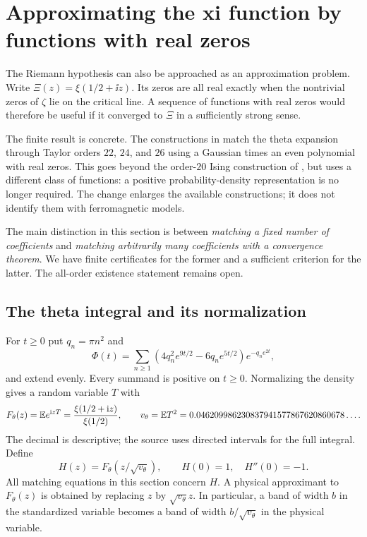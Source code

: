 \section{Approximating the xi function by functions with real zeros}\label{sec:theta}

The Riemann hypothesis can also be approached as an approximation problem. Write $\Xi(z)=\xi(1/2+\ii z)$. Its zeros are all real exactly when the nontrivial zeros of $\zeta$ lie on the critical line. A sequence of functions with real zeros would therefore be useful if it converged to $\Xi$ in a sufficiently strong sense.

The finite result is concrete. The constructions in \cite{R1003} match the theta expansion through Taylor orders $22$, $24$, and $26$ using a Gaussian times an even polynomial with real zeros. This goes beyond the order-$20$ Ising construction of \cite{R994}, but uses a different class of functions: a positive probability-density representation is no longer required. The change enlarges the available constructions; it does not identify them with ferromagnetic models.

The main distinction in this section is between \emph{matching a fixed number of coefficients} and \emph{matching arbitrarily many coefficients with a convergence theorem}. We have finite certificates for the former and a sufficient criterion for the latter. The all-order existence statement remains open.

\subsection{The theta integral and its normalization}
For $t\ge0$ put $q_n=\pi n^2$ and
\begin{equation}\label{eq:theta-density}
 \Phi(t)=\sum_{n\ge1}
       (4q_n^2e^{9t/2}-6q_ne^{5t/2})e^{-q_ne^{2t}},
\end{equation}
and extend evenly. Every summand is positive on $t\ge0$. Normalizing the density gives a random variable $T$ with
\[
 F_\theta(z)=\mathbb E e^{\mathrm i zT}
 =\frac{\xi(1/2+\mathrm i z)}{\xi(1/2)},\qquad
 v_\theta=\mathbb E T^2=0.046209986230837941577867620860678\ldots.
\]
The decimal is descriptive; the source uses directed intervals for the full integral. Define
\[
 H(z)=F_\theta(z/\sqrt{v_\theta}),\qquad H(0)=1,\quad H''(0)=-1.
\]
All matching equations in this section concern $H$. A physical approximant to $F_\theta(z)$ is obtained by replacing $z$ by $\sqrt{v_\theta}z$. In particular, a band of width $b$ in the standardized variable becomes a band of width $b/\sqrt{v_\theta}$ in the physical variable.

